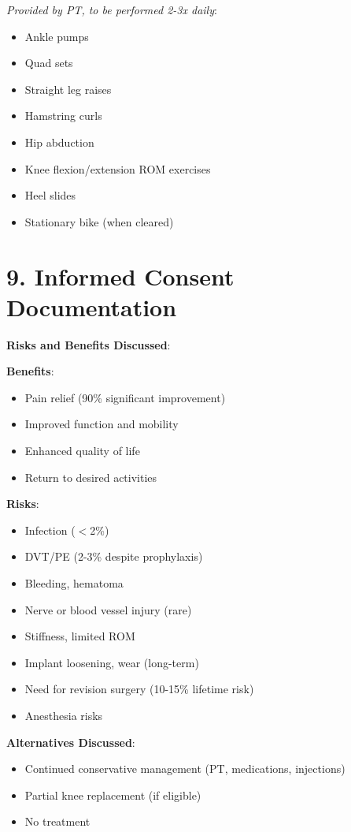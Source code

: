 \documentclass[11pt,letterpaper]{article}
\begin{document}
\textit{Provided by PT, to be performed 2-3x daily}:
\begin{itemize}[leftmargin=*]
    \item Ankle pumps
    \item Quad sets
    \item Straight leg raises
    \item Hamstring curls
    \item Hip abduction
    \item Knee flexion/extension ROM exercises
    \item Heel slides
    \item Stationary bike (when cleared)
\end{itemize}

\section*{9. Informed Consent Documentation}

\textbf{Risks and Benefits Discussed}:

\textbf{Benefits}:
\begin{itemize}[leftmargin=*]
    \item Pain relief (90\% significant improvement)
    \item Improved function and mobility
    \item Enhanced quality of life
    \item Return to desired activities
\end{itemize}

\textbf{Risks}:
\begin{itemize}[leftmargin=*]
    \item Infection ($<$2\%)
    \item DVT/PE (2-3\% despite prophylaxis)
    \item Bleeding, hematoma
    \item Nerve or blood vessel injury (rare)
    \item Stiffness, limited ROM
    \item Implant loosening, wear (long-term)
    \item Need for revision surgery (10-15\% lifetime risk)
    \item Anesthesia risks
\end{itemize}

\textbf{Alternatives Discussed}:
\begin{itemize}[leftmargin=*]
    \item Continued conservative management (PT, medications, injections)
    \item Partial knee replacement (if eligible)
    \item No treatment
\end{itemize}
\end{document}
